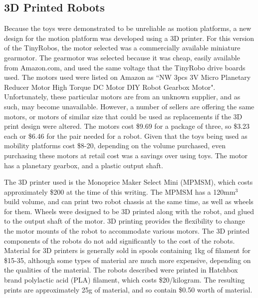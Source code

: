 \subsection{3D Printed Robots}

Because the toys were demonstrated to be unreliable as motion platforms, a new design for the motion platform was developed using a 3D printer. 
For this version of the TinyRobos, the motor selected was a commercially available miniature gearmotor. 
The gearmotor was selected because it was cheap, easily available from Amazon.com, and used the same voltage that the TinyRobo drive boards used. 
The motors used were listed on Amazon as ``NW 3pcs 3V Micro Planetary Reducer Motor High Torque DC Motor DIY Robot Gearbox Motor". 
Unfortunately, these particular motors are from an unknown supplier, and as such, may become unavailable. 
However, a number of sellers are offering the same motors, or motors of similar size that could be used as replacements if the 3D print design were altered. 
The motors cost \$9.69 for a package of three, so \$3.23 each or \$6.46 for the pair needed for a robot. 
Given that the toys being used as mobility platforms cost \$8-20, depending on the volume purchased, even purchasing these motors at retail cost was a savings over using toys.
The motor has a planetary gearbox, and a plastic output shaft. 

The 3D printer used is the Monoprice Maker Select Mini (MPMSM), which costs approximately \$200 at the time of this writing.
The MPMSM has a 120mm$^3$ build volume, and can print two robot chassis at the same time, as well as wheels for them.
Wheels were designed to be 3D printed along with the robot, and glued to the output shaft of the motor. 
3D printing provides the flexibility to change the motor mounts of the robot to accommodate various motors. 
The 3D printed components of the robots do not add significantly to the cost of the robots. 
Material for 3D printers is generally sold in spools containing 1kg of filament for \$15-35, although some types of material are much more expensive, depending on the qualities of the material.
The robots described were printed in Hatchbox brand polylactic acid (PLA) filament, which costs \$20/kilogram. 
The resulting prints are approximately 25g of material, and so contain \$0.50 worth of material. 

